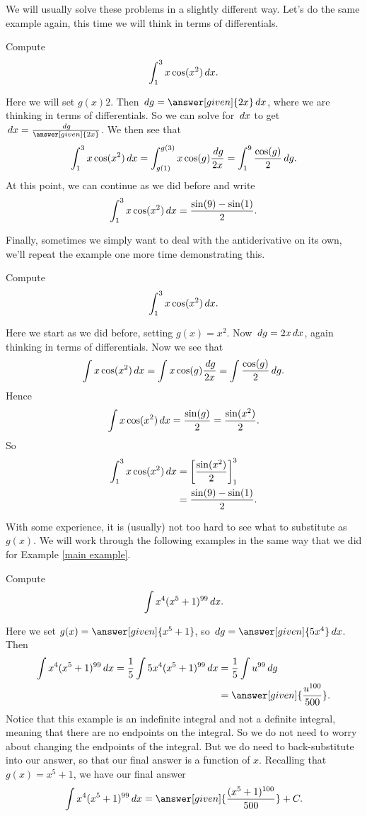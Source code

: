 \documentclass{ximera}
\begin{document}
We will usually solve these problems in a slightly different way. Let's do the same
example again, this time we will think in terms of differentials.

\begin{example}\label{main example}
Compute
\[
\int_1^3 x\cos(x^2)\,d x.
\]
\begin{explanation}
Here we will set $g(x)2$. Then $\d g =  \answer[given]{2x} \d x$, where we are thinking in terms
of differentials. So we can solve for $\,d x$ to get $\d x = \frac{\d g}{\answer[given]{2x}}$.  We then see that
\[
\int_1^3 x \cos(x^2) \,d x = \int_{g(1)}^{g(3)} x \cos(g) \frac{\,d g}{2x} = \int_{1}^{9} \frac{\cos(g)}{2}\,d g .
\]
At this point, we can continue as we did before and write
\[
\int_1^3 x\cos(x^2)\,d x= \frac{\sin(9) -\sin(1)}{2}.
\]
\end{explanation}
\end{example}

Finally, sometimes we simply want to deal with the antiderivative on
its own, we'll repeat the example one more time demonstrating this.

\begin{example}
Compute
\[
\int_1^3 x\cos(x^2)\,d x.
\]
\begin{explanation}
Here we start as we did before, setting $g(x)=x^2$. Now $\,d g =  2x \,d x$,
again thinking in terms of differentials. Now we see that
\[
\int x \cos(x^2) \,d x = \int x \cos(g) \frac{\,d g}{2x} = \int \frac{\cos(g)}{2}\,d g .
\]
Hence 
\[
\int x\cos(x^2)\,d x = \frac{\sin(g)}{2} = \frac{\sin(x^2)}{2}.
\]
So
\begin{align*}
\int_1^3 x\cos(x^2)\,d x &=\bigg[ \frac{\sin(x^2)}{2} \bigg]_1^3\\
&= \frac{\sin(9) -\sin(1)}{2}.
\end{align*}
\end{explanation}
\end{example}

With some experience, it is (usually) not too hard to see what to substitute as $g(x)$.
We will work through the following examples in the same way that we did for Example \ref{main example}.  

\begin{example}
Compute
\[
\int x^4(x^5+1)^{99} \,d x.
\]
\begin{explanation}
Here we set $g(x) =  \answer[given]{x^5+1}$, so $\d g =  \answer[given]{5x^4} \d x$.  Then
\begin{align*}
\int x^4(x^5+1)^{99} \d x = \frac{1}{5} \int 5x^4 (x^5+1)^{99} \d x &= \frac{1}{5} \int u^{99} \d g\\
&= \answer[given]{\frac{u^{100}}{500}}.
\end{align*}
Notice that this example is an indefinite integral and not a definite integral, meaning that there are no endpoints on the integral.  
So we do not need to worry about changing the endpoints of the integral.  
But we do need to back-substitute into our answer, so that our final answer is a function of $x$.  
Recalling that $g(x) =  x^5+1$, we have our final answer
\[
\int x^4(x^5+1)^{99} \d x= \answer[given]{\frac{(x^5+1)^{100}}{500}}+C.
\]
\end{explanation}
\end{example}
\end{document}
